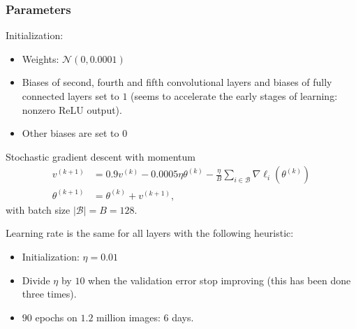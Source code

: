 \begin{frame}
	\frametitle{Parameters}
	
	Initialization: 
	\begin{itemize}
		\item Weights: $\mathcal{N}(0, 0.0001)$
		\item Biases of second, fourth and fifth convolutional layers and biases of fully connected layers set to $1$ (seems to accelerate the early stages of learning: nonzero ReLU output). 
		\item Other biases are set to $0$
	\end{itemize}



	
	\begin{block}{Stochastic gradient descent with momentum}
	\begin{align*}
	v^{(k+1)} & = 0.9 v^{(k)} - 0.0005 \eta \theta^{(k)} - \frac{\eta}{B} \sum_{i \in \mathcal{B}} \nabla \ell_i (\theta^{(k)})\\
	\theta^{(k+1)} & = \theta^{(k)} + v^{(k+1)},
	\end{align*}	
	with batch size $|\mathcal{B}| = B = 128$. 
	\end{block}



Learning rate is the same for all layers with the following heuristic: 
\begin{itemize}
	\item Initialization: $\eta = 0.01$
	\item Divide $\eta$ by $10$ when the validation error stop improving
	(this has been done three times).
	\item $90$ epochs on $1.2$ million images: 6 days.
\end{itemize}


\end{frame}

